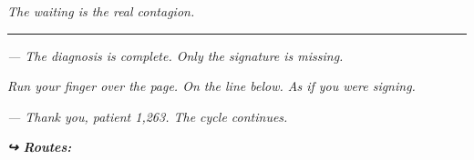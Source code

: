 \noindent \textit{The waiting is the real contagion.}

\vspace{0.5em}\noindent\rule{\textwidth}{0.5pt}\vspace{0.5em}

\noindent \textit{--- The diagnosis is complete. Only the signature is missing.}

\noindent \textit{Run your finger over the page. On the line below. As if you were signing.}

\noindent \textit{--- Thank you, patient 1,263. The cycle continues.}

\vspace{0.5em}
\noindent\textit{\textbf{↪ Routes:}  \rotasep {}}
